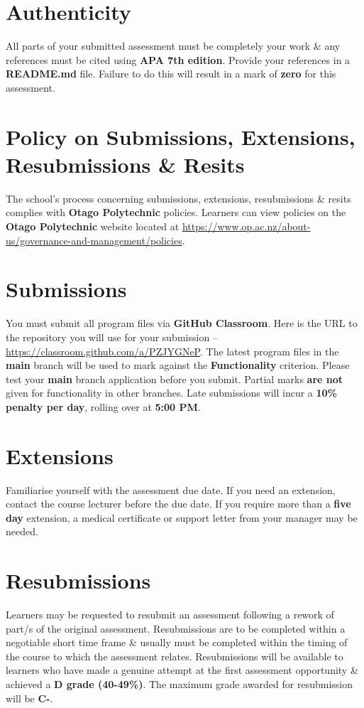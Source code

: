\documentclass{article}
\begin{document}
\section*{Authenticity}
All parts of your submitted assessment must be completely your work \& any references must be cited using \textbf{APA 7th edition}. Provide your references in a \textbf{README.md} file. Failure to do this will result in a mark of \textbf{zero} for this assessment.

\section*{Policy on Submissions, Extensions, Resubmissions \& Resits}
The school's process concerning submissions, extensions, resubmissions \& resits complies with \textbf{Otago Polytechnic} policies. Learners can view policies on the \textbf{Otago Polytechnic} website located at \href{https://www.op.ac.nz/about-us/governance-and-management/policies}{https://www.op.ac.nz/about-us/governance-and-management/policies}.

\section*{Submissions}
You must submit all program files via \textbf{GitHub Classroom}. Here is the URL to the repository you will use for your submission – \href{https://classroom.github.com/a/PZJYGNeP}{https://classroom.github.com/a/PZJYGNeP}. The latest program files in the \textbf{main} branch will be used to mark against the \textbf{Functionality} criterion. Please test your \textbf{main} branch application before you submit. Partial marks \textbf{are not} given for functionality in other branches. Late submissions will incur a \textbf{10\% penalty per day}, rolling over at \textbf{5:00 PM}.

\section*{Extensions}
Familiarise yourself with the assessment due date. If you need an extension, contact the course lecturer before the due date. If you require more than a \textbf{five day} extension, a medical certificate or support letter from your manager may be needed.

\section*{Resubmissions}
Learners may be requested to resubmit an assessment following a rework of part/s of the original assessment. Resubmissions are to be completed within a negotiable short time frame \& usually must be completed within the timing of the course to which the assessment relates. Resubmissions will be available to learners who have made a genuine attempt at the first assessment opportunity \& achieved a \textbf{D grade (40-49\%)}. The maximum grade awarded for resubmission will be \textbf{C-}.
\end{document}
